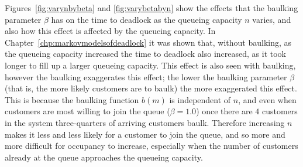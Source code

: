 \documentclass{article}
\begin{document}
Figures~\ref{fig:varynbybeta} and \ref{fig:varybetabyn} show the effects that the baulking parameter $\beta$ has on the time to deadlock as the queueing capacity $n$ varies, and also how this effect is affected by the queueing capacity.
In Chapter~\ref{chp:markovmodelsofdeadlock} it was shown that, without baulking, as the queueing capacity increased the time to deadlock also increased, as it took longer to fill up a larger queueing capacity.
This effect is also seen with baulking, however the baulking exaggerates this effect; the lower the baulking parameter $\beta$ (that is, the more likely customers are to baulk) the more exaggerated this effect.
This is because the baulking function $b(m)$ is independent of $n$, and even when customers are most willing to join the queue ($\beta = 1.0$) once there are $4$ customers in the system three-quarters of arriving customers baulk.
Therefore increasing $n$ makes it less and less likely for a customer to join the queue, and so more and more difficult for occupancy to increase, especially when the number of customers already at the queue approaches the queueing capacity.
\end{document}
